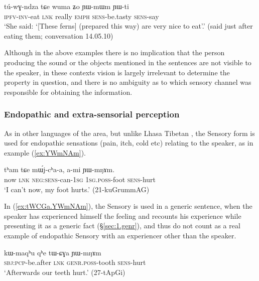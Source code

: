 \begin{exe}
\ex \label{ex:YWmWm}
\gll tú-wɣ-ndza tɕe wuma ʑo ɲɯ-mɯm ɲɯ-ti \\
\textsc{ipfv}-\textsc{inv}-eat \textsc{lnk} really \textsc{emph} \textsc{sens}-be.tasty \textsc{sens}-say \\
\glt `She said: `[These ferns] (prepared this way) are very nice to eat'.' (said just after eating them; conversation 14.05.10)
\end{exe}

Although in the above examples there is no implication that the person producing the sound or the objects mentioned in the sentences are not visible to the speaker, in these contexts vision is largely irrelevant to determine the property in question, and there is no ambiguity as to which sensory channel was responsible for obtaining the information.  


\subsubsection{Endopathic and extra-sensorial perception} \label{sec:sensory.endopathic}
As in other languages of the area, but unlike Lhasa Tibetan \citep{tournadre14evidentiality}, the Sensory form is used for endopathic sensations (pain, itch, cold etc)  relating to the speaker, as in example (\ref{ex:YWmNAm}).

\begin{exe}
\ex \label{ex:YWmNAm}
\gll tʰam tɕe mɯ́j-cʰa-a, a-mi ɲɯ-mŋɤm. \\
now \textsc{lnk} \textsc{neg}:\textsc{sens}-can-\textsc{1sg} \textsc{1sg}.\textsc{poss}-foot \textsc{sens}-hurt \\
\glt `I can't now, my foot hurts.' (21-kuGrummAG)
\end{exe}


In (\ref{ex:tWCGa.YWmNAm}), the Sensory is used in a generic sentence, when the speaker has experienced himself the feeling and recounts his experience while presenting it as a generic fact (§\ref{sec:1.genr}), and thus do not count as a real example of endopathic Sensory with an experiencer other than the speaker.

\begin{exe}
\ex \label{ex:tWCGa.YWmNAm}
\gll kɯ-maqʰu qʰe tɯ-ɕɣa ɲɯ-mŋɤm \\
\textsc{sbj}:\textsc{pcp}-be.after \textsc{lnk} \textsc{genr}.\textsc{poss}-tooth \textsc{sens}-hurt \\
\glt `Afterwards our teeth hurt.' (27-tApGi)
\end{exe}

